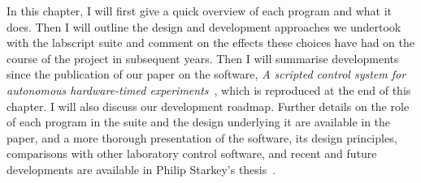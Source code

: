 In this chapter, I will first give a quick overview of each program and what it does. Then I will outline the design and development approaches we undertook with the labscript suite and comment on the effects these choices have had on the course of the project in subsequent years. Then I will summarise developments since the publication of our paper on the software, \emph{A scripted control system for autonomous hardware-timed experiments}~\cite{starkey_scripted_2013}, which is reproduced at the end of this chapter. I will also discuss our development roadmap. Further details on the role of each program in the suite and the design underlying it are available in the paper, and a more thorough presentation of the software, its design principles, comparisons with other laboratory control software, and recent and future developments are available in Philip Starkey's thesis~\cite{starkey_thesis_2018}.

